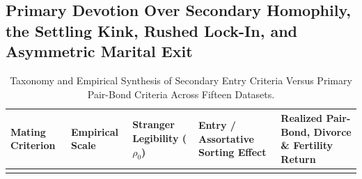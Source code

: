 \subsection{Primary Devotion Over Secondary Homophily, the Settling Kink, Rushed Lock-In, and Asymmetric Marital Exit}

\begin{table}[!t]
\caption{Taxonomy and Empirical Synthesis of Secondary Entry Criteria Versus Primary Pair-Bond Criteria Across Fifteen Datasets.}\label{tab:primary_secondary}
\scriptsize
\renewcommand{\arraystretch}{0.83}
\setlength{\tabcolsep}{3.8pt}
\begin{tabularx}{\textwidth}{@{}>{\raggedright\arraybackslash}p{}>{\raggedright\arraybackslash}p{}>{\raggedright\arraybackslash}p{}LL@{}}
\toprule
Mating Criterion & Empirical Scale & Stranger Legibility ($\rho_0$) & Entry / Assortative Sorting Effect & Realized Pair-Bond, Divorce \& Fertility Return \\
\midrule
{}
\bottomrule
\end{tabularx}
\vspace{-3.5pt}
\end{table}

